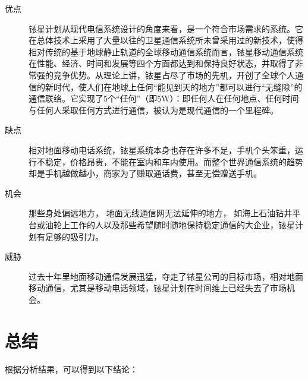 \documentclass{ctexart}
\begin{document}
\begin{description}
	\item[优点]铱星计划从现代电信系统设计的角度来看，是一个符合市场需求的系统。它在总体技术上采用了大量以往的卫星通信系统所未曾采用过的新技术，使得相对传统的基于地球静止轨道的全球移动通信系统而言，铱星移动通信系统在性能、经济、时间和发展等四个方面都达到和保持良好状态，并取得了非常强的竞争优势。从理论上讲，铱星占尽了市场的先机，开创了全球个人通信的新时代，使人们在地球上任何\enquote{能见到天的地方}都可以进行\enquote{无缝隙}的通信联络。它实现了5个\enquote{任何}（即5W）：即任何人在任何地点、任何时间与任何人采取任何方式进行通信，被认为是现代通信的一个里程碑。
	\item[缺点]相对地面移动电话系统，铱星系统本身也存在许多不足，手机个头笨重，运行不稳定，价格昂贵，不能在室内和车内使用。而整个世界通信系统的趋势却是手机越做越小，商家为了赚取通话费，甚至无偿赠送手机。
	\item[机会]那些身处偏远地方， 地面无线通信网无法延伸的地方， 如海上石油钻井平台或油轮上工作的人以及那些希望随时随地保持稳定通信的大企业，铱星计划有足够的吸引力。
	\item[威胁]过去十年里地面移动通信发展迅猛，夺走了铱星公司的目标市场，相对地面移动通信，尤其是移动电话领域，铱星计划在时间维上已经失去了市场机会。
\end{description}

\section{总结}%
\label{sec:总结}

根据分析结果，可以得到以下结论：
\end{document}
